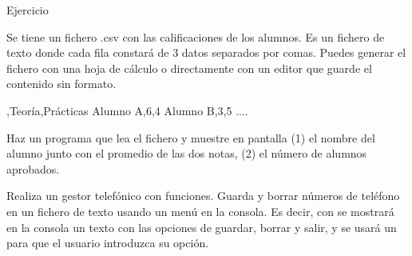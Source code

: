 \documentclass[10pt, envcountsect , spanish]{beamer}
\begin{document}
\begin{frame}[fragile]{Ejercicio} 

\begin{ejercicio}{} \small
Se tiene un fichero .csv con las calificaciones de los alumnos. 
Es un fichero de texto donde cada fila constará de 3 datos separados por comas.
Puedes generar el fichero con una hoja de cálculo o directamente con un editor que guarde el contenido sin formato.
\begin{pyverbatim}
,Teoría,Prácticas
Alumno A,6,4
Alumno B,3,5
....
\end{pyverbatim}

Haz un programa que lea el fichero y muestre en pantalla (1) el nombre del alumno junto con el promedio de las dos notas, (2) el número de alumnos aprobados.
\end{ejercicio}


\begin{ejercicio}{} \small
Realiza un gestor telefónico con funciones. Guarda y borrar números de teléfono en un fichero de texto usando un menú en la consola. Es decir, con  se mostrará en la consola un texto con las opciones de guardar, borrar y salir, y se usará un  para que el usuario introduzca su opción.
\end{ejercicio}
\end{frame}
\end{document}
